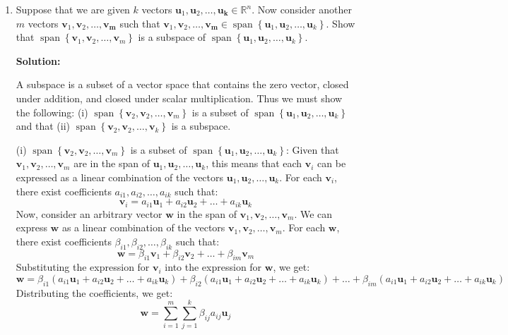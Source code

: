 \documentclass{homework}
\begin{document}
\begin{enumerate}[label=(\alph*)]
	\item Suppose that we are given $k$ vectors $\mathbf{u}_1, \mathbf{u}_2,
		      \ldots, \mathbf{u}_{\mathbf{k}} \in \mathbb{R}^n$. Now consider another
	      $m$ vectors $\mathbf{v}_1, \mathbf{v}_2, \ldots,
		      \mathbf{v}_{\mathbf{m}}$ such that
	      $\mathbf{v}_1, \mathbf{v}_2, \ldots, \mathbf{v}_{\mathbf{m}}
		      \in \operatorname{span}\left\{\mathbf{u}_{1}, \mathbf{u}_{2}, \ldots,
		      \mathbf{u}_{k}\right\}$. Show that $\operatorname{span}\left\{\mathbf{v}_{1},
		      \mathbf{v}_{2}, \ldots, \mathbf{v}_{m}\right\}$ is a subspace of
	      $\operatorname{span}\left\{\mathbf{u}_{1}, \mathbf{u}_{2}, \ldots,
		      \mathbf{u}_{k}\right\}$.


	      \par \textbf{Solution:}
	      \par A subspace is a subset of a vector space that contains the zero
	      vector, closed under addition, and closed under scalar multiplication.
	      Thus we must show the following: (i) $\operatorname{span}\left\{\mathbf{v}_{2},
		      \mathbf{v}_{2}, \ldots, \mathbf{v}_{m}\right\}$ is a subset of
	      $\operatorname{span}\left\{\mathbf{u}_{1}, \mathbf{u}_{2}, \ldots,
		      \mathbf{u}_{k}\right\}$ and that (ii) $\operatorname{span}\left\{\mathbf{v}_{2},
		      \mathbf{v}_{2}, \ldots, \mathbf{v}_{k}\right\}$ is a subspace.

	      \par (i) $\operatorname{span}\left\{\mathbf{v}_{2},
		      \mathbf{v}_{2}, \ldots, \mathbf{v}_{m}\right\}$ is a subset of
	      $\operatorname{span}\left\{\mathbf{u}_{1}, \mathbf{u}_{2}, \ldots,
		      \mathbf{u}_{k}\right\}$: Given that $\mathbf{v}_1, \mathbf{v}_2,
		      \ldots, \mathbf{v}_m$ are in the span of $\mathbf{u}_1, \mathbf{u}_2,
		      \ldots, \mathbf{u}_k$, this means that each $\mathbf{v}_i$ can be
	      expressed as a linear combination of the vectors $\mathbf{u}_1,
		      \mathbf{u}_2, \ldots, \mathbf{u}_k$. For each
	      $\mathbf{v}_i$, there exist coefficients $a_{i1}, a_{i2}, \ldots,
		      a_{ik}$ such that:
	      $$ \mathbf{v}_i = a_{i1}\mathbf{u}_1 + a_{i2}\mathbf{u}_2 + \ldots + a_{ik}\mathbf{u}_k $$
	      Now, consider an arbitrary vector $\mathbf{w}$ in the span of
	      $\mathbf{v}_1, \mathbf{v}_2, \ldots, \mathbf{v}_m$. We can express
	      $\mathbf{w}$ as a linear combination of the vectors $\mathbf{v}_1,
		      \mathbf{v}_2, \ldots, \mathbf{v}_m$. For each
	      $\mathbf{w}$, there exist coefficients $\beta_{i1}, \beta_{i2}, \ldots,
		      \beta_{ik}$ such that:
	      $$ \mathbf{w} = \beta_{i1}\mathbf{v}_1 + \beta_{i2}\mathbf{v}_2 + \ldots + \beta_{im}\mathbf{v}_m $$
	      Substituting the expression for $\mathbf{v}_i$ into the expression for $\mathbf{w}$, we get:
	      $$ \mathbf{w} = \beta_{i1}(a_{i1}\mathbf{u}_1 + a_{i2}\mathbf{u}_2 + \ldots + a_{ik}\mathbf{u}_k) + \beta_{i2}(a_{i1}\mathbf{u}_1 + a_{i2}\mathbf{u}_2 + \ldots + a_{ik}\mathbf{u}_k) + \ldots + \beta_{im}(a_{i1}\mathbf{u}_1 + a_{i2}\mathbf{u}_2 + \ldots + a_{ik}\mathbf{u}_k) $$
	      Distributing the coefficients, we get:
	      $$ \mathbf{w} = \sum_{i=1}^{m} \sum_{j=1}^{k} \beta_{ij}a_{ij}\mathbf{u}_j $$


\end{enumerate}
\end{document}
